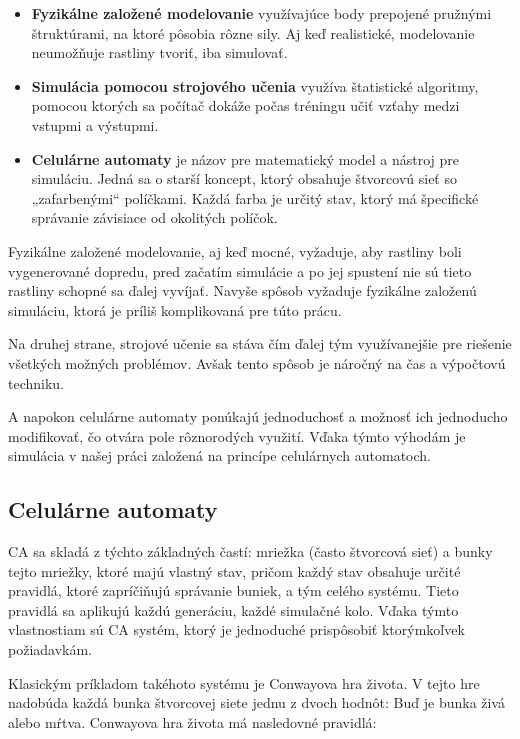 \documentclass[12pt]{article}
\begin{document}
\begin{itemize}
	\item \textbf{Fyzikálne založené modelovanie} využívajúce body prepojené
	      pružnými štruktúrami, na ktoré pôsobia rôzne sily. Aj keď realistické,
	      modelovanie neumožňuje rastliny tvoriť, iba simulovať.
	\item \textbf{Simulácia pomocou strojového učenia} \cite{wiki:Machine_learning}
	      využíva štatistické
	      algoritmy, pomocou ktorých sa počítač dokáže počas tréningu učiť vzťahy medzi
	      vstupmi a výstupmi.
	\item \textbf{Celulárne automaty} \cite{wiki:Cellular_automaton}
	      je názov pre matematický model a nástroj pre simuláciu. Jedná sa
	      o starší koncept, ktorý obsahuje štvorcovú sieť so „zafarbenými“
	      políčkami. Každá farba je určitý stav, ktorý má špecifické správanie
	      závisiace od okolitých políčok.
\end{itemize}

Fyzikálne založené modelovanie, aj keď mocné, vyžaduje, aby rastliny boli
vygenerované dopredu, pred začatím simulácie a po jej spustení nie sú tieto
rastliny schopné sa ďalej vyvíjať. Navyše spôsob vyžaduje fyzikálne založenú
simuláciu, ktorá je príliš komplikovaná pre túto prácu.

Na druhej strane, strojové učenie sa stáva čím ďalej tým využívanejšie pre
riešenie všetkých možných problémov. Avšak tento spôsob je náročný na čas
a výpočtovú techniku.

A napokon celulárne automaty ponúkajú jednoduchosť a možnosť ich jednoducho
modifikovať, čo otvára pole rôznorodých využití. Vďaka týmto výhodám je simulácia
v našej práci založená na princípe celulárnych automatoch.

\subsection{Celulárne automaty}

CA sa skladá z týchto základných častí: mriežka (často štvorcová sieť)
a bunky tejto mriežky, ktoré majú vlastný stav, pričom každý stav obsahuje
určité pravidlá, ktoré zapríčiňujú správanie buniek, a tým celého systému.
Tieto pravidlá sa aplikujú každú generáciu, každé simulačné kolo.
Vďaka týmto vlastnostiam sú CA systém, ktorý je jednoduché prispôsobiť ktorýmkoľvek
požiadavkám.

Klasickým príkladom takéhoto systému je Conwayova hra života. \cite{wiki:Conway's_Game_of_Life}
V tejto hre nadobúda každá bunka štvorcovej siete jednu z dvoch hodnôt:
Buď je bunka živá alebo mŕtva. Conwayova hra života má nasledovné pravidlá:
\end{document}

